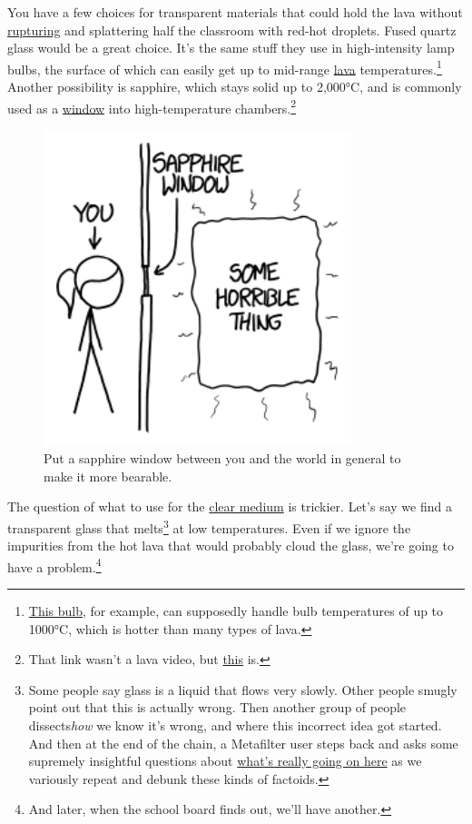 {{You have a few choices for transparent materials that could hold the lava without \href{https://www.youtube.com/watch?v=a6pXf05Ph9Q}{rupturing} and splattering half the classroom with red-hot droplets. Fused quartz glass would be a great choice. It's the same stuff they use in high-intensity lamp bulbs, the surface of which can easily get up to mid-range \href{https://www.youtube.com/watch?v=kHO389dvj6Y}{lava} temperatures.{\footnote{ \href{http://www.amazon.ca/Philips-400w-GY9-5-Short-Light/dp/B0062ATTRW}{This bulb}, for example, can supposedly handle bulb temperatures of up to 1000°C, which is hotter than many types of lava.} } Another possibility is sapphire, which stays solid up to 2,000°C, and is commonly used as a \href{http://www.newport.com/Sapphire-Optical-Windows/378626/1033/info.aspx}{window} into high-temperature chambers.{\footnote{That link wasn't a lava video, but \href{https://www.youtube.com/watch?v=v\_VyKplXtOM}{this} is.} } }

\begin{figure}[!htbp]
\centering
\includegraphics[scale=0.5, max width=0.8\textwidth]{imgs/a/122/horrible.png}
\caption{Put a sapphire window between you and the world in general to make it more bearable.}
\end{figure}

{The question of what to use for the \href{https://www.youtube.com/watch?v=scGvM\_VoPwk\#t=31}{clear medium} is trickier. Let's say we find a transparent glass that melts{\footnote{Some people say glass is a liquid that flows very slowly. Other people smugly point out that this is actually wrong. Then another group of people dissects\emph{how} we know it's wrong, and where this incorrect idea got started. And then at the end of the chain, a Metafilter user steps back and asks some supremely insightful questions about \href{http://www.metafilter.com/141772/MetaFolkloreFilter\#5676767}{what's really going on here} as we variously repeat and debunk these kinds of factoids.} } at low temperatures. Even if we ignore the impurities from the hot lava that would probably cloud the glass, we're going to have a problem.{\footnote{And later, when the school board finds out, we'll have another.} } }

}
